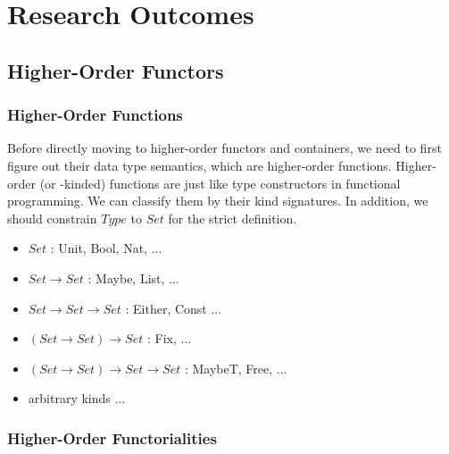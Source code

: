 \chapter{Research Outcomes}


\section{Higher-Order Functors}

\subsection{Higher-Order Functions}

Before directly moving to higher-order functors and containers, we need to first figure out their data type semantics, which are higher-order functions. Higher-order (or -kinded) functions are just like type constructors in functional programming. We can classify them by their kind signatures. In addition, we should constrain $Type$ to $Set$ for the strict definition.

\begin{itemize}
  \item{$Set$ : Unit, Bool, Nat, ...} 
  \item{$Set \to Set$ : Maybe, List, ...}
  \item{$Set \to Set \to Set$ : Either, Const ...}
  \item{$(Set \to Set) \to Set$ : Fix, ...}
  \item{$(Set \to Set) \to Set \to Set$ : MaybeT, Free, ...}
  \item{arbitrary kinds ...}
\end{itemize}



\subsection{Higher-Order Functorialities}

